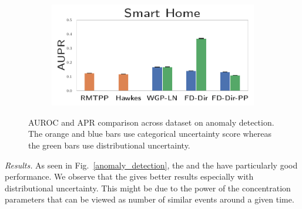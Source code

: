\begin{figure}
\begin{subfigure}{0.25\textwidth}
    \end{subfigure}%
    \begin{subfigure}{0.25\textwidth}
        \centering
        \includegraphics[width=\linewidth]{images/uncertainty-apr-kast-home.pdf}
    \end{subfigure}
    \caption{AUROC and APR comparison across dataset on anomaly detection. The orange and blue bars use categorical uncertainty score whereas the green bars use distributional uncertainty.}
    \label{fig:anomaly_detection}
    \vspace{-0.5cm}
\end{figure}

\textit{Results.} As seen in Fig.\ \ref{anomaly_detection}, the \DirModel and the \GPModel have particularly good performance. We observe that the \DirModel gives better results especially with distributional uncertainty. This might be due to the power of the concentration parameters that can be viewed as number of similar events around a given time.